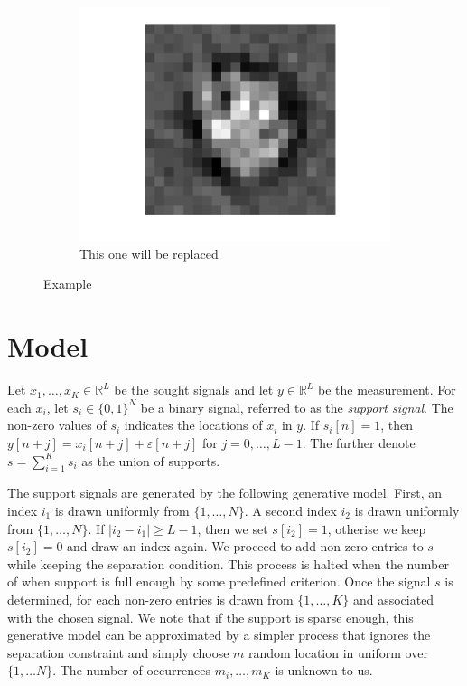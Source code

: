 \documentclass[english]{article}
\numberwithin{equation}{section}
\theoremstyle{plain}
\theoremstyle{definition}
\theoremstyle{remark}
\theoremstyle{plain}
\theoremstyle{remark}
\theoremstyle{plain}
\theoremstyle{plain}
\newcommand{\RL}{\mathbb{R}^L}
\newcommand{\RN}{\mathbb{R}^L}
\begin{document}
\begin{figure}[ht!]
\begin{subfigure}{.5\textwidth}
	\centering
	\includegraphics[scale=0.5]{signal2D_RRR}
	\caption{This one will be replaced}
	\label{fig:signal2D_RRR}
\end{subfigure}

\caption{Example}
\label{fig:example}
\end{figure}

\section{Model}  \label{sec:model}

Let $x_1,\ldots,x_K\in\RL$ be the sought signals and let $y\in\RN$ be the measurement. For each $x_i$, let $s_i\in\{0,1\}^N$ be a binary signal, referred to as the \emph{support signal}. The non-zero values of $s_i$ indicates the locations of $x_i$ in $y$. If $s_i[n]=1$, then $y[n+j] = x_i[n+j]+\varepsilon[n+j]$ for $j=0,\ldots,L-1$. The further denote $s = \sum_{i=1}^Ks_i$ as the union of supports. 

The support signals are generated by the following generative model. First, an index $i_1$ is drawn uniformly from $\{1,\ldots,N\}$. A second index $i_2$ is drawn uniformly from $\{1,\ldots,N\}$. If $\vert i_2-i_1\vert \geq L-1$,
then we set $s[i_2]=1$, otherise we keep $s[i_2]=0$ and draw an index again. We proceed to add non-zero entries to $s$ while keeping the separation condition. This process is halted when the number of when support is full enough by some predefined criterion. Once the signal $s$ is determined, for each non-zero entries is drawn from $\{1,\ldots,K\}$ and associated with the chosen signal. We note that if the support is sparse enough, this generative model can be approximated by a simpler process that ignores the separation constraint and simply choose $m$ random location in uniform over $\{1,\ldots N\}$. The number of occurrences $m_i,\ldots,m_K$ is unknown to us. 
\end{document}
